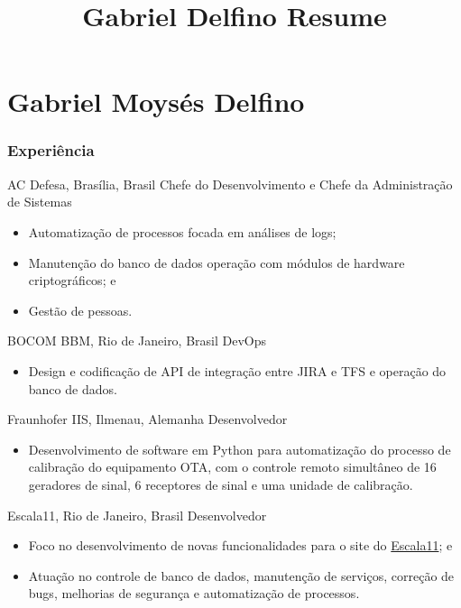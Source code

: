 \documentclass{tccv}
\title{Gabriel Delfino Resume}
\begin{document}
\part{Gabriel Moysés Delfino}


\section{Experiência}

    \begin{eventlist}
    	
    	{AC Defesa, Brasília, Brasil}
    	{Chefe do Desenvolvimento e Chefe da Administração de Sistemas}
    	\begin{itemize}
    		\item Automatização de processos focada em análises de logs;
    		\item Manutenção do banco de dados operação com módulos de hardware criptográficos; e
    		\item Gestão de pessoas.
    	\end{itemize}

            {BOCOM BBM, Rio de Janeiro, Brasil}
            {DevOps}
            \begin{itemize}
                \item Design e codificação de API de integração entre JIRA e TFS e operação do banco de dados.
            \end{itemize}
 
            {Fraunhofer IIS, Ilmenau, Alemanha}
            {Desenvolvedor}
            \begin{itemize}
                \item Desenvolvimento de software em Python para automatização do processo de calibração do equipamento OTA, com o controle remoto simultâneo de 16 geradores de sinal, 6 receptores de sinal e uma unidade de calibração.
            \end{itemize}
        
            {Escala11, Rio de Janeiro, Brasil}
            {Desenvolvedor}
            \begin{itemize}
                \item Foco no desenvolvimento de novas funcionalidades para o site do \href{https://www.escala11.com/}{Escala11}; e
                \item Atuação no controle de banco de dados, manutenção de serviços, correção de bugs, melhorias de segurança e automatização de processos.
            \end{itemize}
    \end{eventlist}
\end{document}
